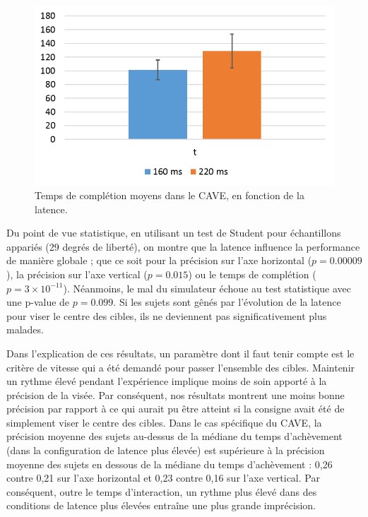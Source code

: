 	\begin{figure}
		\centering
		\includegraphics[width=0.8\linewidth]{Figures/CaveCompletionTimeResults.png}
		\caption{Temps de complétion moyens dans le CAVE, en fonction de la latence.}
		\label{fig:cave_completion_time}
	\end{figure}
	
	\par Du point de vue statistique, en utilisant un test de Student pour échantillons appariés (29 degrés de liberté), on montre que la latence influence la performance de manière globale ; que ce soit pour la précision sur l'axe horizontal ($p = 0.00009$), la précision sur l'axe vertical ($p = 0.015$) ou le temps de complétion ($p = 3 \times 10^{-11}$). Néanmoins, le mal du simulateur échoue au test statistique avec une p-value de $p = 0.099$. Si les sujets sont gênés par l'évolution de la latence pour viser le centre des cibles, ils ne deviennent pas significativement plus malades.
	
	\par Dans l'explication de ces résultats, un paramètre dont il faut tenir compte est le critère de vitesse qui a été demandé pour passer l'ensemble des cibles. Maintenir un rythme élevé pendant l'expérience implique moins de soin apporté à la précision de la visée. Par conséquent, nos résultats montrent une moins bonne précision par rapport à ce qui aurait pu être atteint si la consigne avait été de simplement viser le centre des cibles. Dans le cas spécifique du CAVE, la précision moyenne des sujets au-dessus de la médiane du temps d'achèvement (dans la configuration de latence plus élevée) est supérieure à la précision moyenne des sujets en dessous de la médiane du temps d'achèvement : 0,26 contre 0,21 sur l'axe horizontal et 0,23 contre 0,16 sur l'axe vertical. Par conséquent, outre le temps d'interaction, un rythme plus élevé dans des conditions de latence plus élevées entraîne une plus grande imprécision. 

